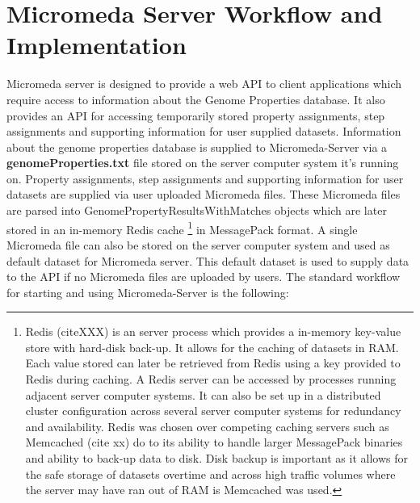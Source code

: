 \section{Micromeda Server Workflow and Implementation}

Micromeda server is designed to provide a web API to client applications which require access to information about the Genome Properties database. It also provides an API for accessing temporarily stored property assignments, step assignments and supporting information for user supplied datasets. Information about the genome properties database is supplied to Micromeda-Server via a \textbf{genomeProperties.txt} file stored on the server computer system it's running on. Property assignments, step assignments and supporting information for user datasets are supplied via user uploaded Micromeda files. These Micromeda files are parsed into GenomePropertyResultsWithMatches objects which are later stored in an in-memory Redis cache \footnote{Redis (citeXXX) is an server process which provides a in-memory key-value store with hard-disk back-up. It allows for the caching of datasets in RAM. Each value stored can later be retrieved from Redis using a key provided to Redis during caching. A Redis server can be accessed by processes running adjacent server computer systems. It can also be set up in a distributed cluster configuration across several server computer systems for redundancy and availability. Redis was chosen over competing caching servers such as Memcached (cite xx) do to its ability to handle larger MessagePack binaries and ability to back-up data to disk. Disk backup is important as it allows for the safe storage of datasets overtime and across high traffic volumes where the server may have ran out of RAM is Memcached was used.} in MessagePack format. A single Micromeda file can also be stored on the server computer system and used as default dataset for Micromeda server. This default dataset is used to supply data to the API if no Micromeda files are uploaded by users. The standard workflow for starting and using Micromeda-Server is the following:

